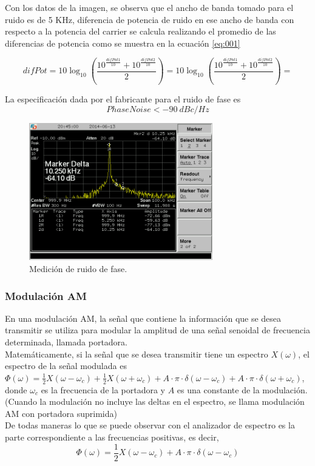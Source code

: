 \documentclass[a4paper,10pt]{article}
\begin{document}
		\indent Con los datos de la imagen, se observa que el ancho de banda 
		tomado para el ruido es de 5 KHz, diferencia de potencia de ruido en ese
		ancho de banda con respecto a la potencia del carrier se calcula 
		realizando el promedio de las diferencias de potencia como se muestra en
		la ecuaci\'on \ref{eq:001}

		\begin{equation} \label{eq:001}
			difPot = 10\log_{10}(\frac{10^{\frac{difPot1}{10}} + 10^{\frac
			{difPot2}{10}}}{2}) = 10\log_{10}(\frac{10^{\frac{difPot1}{10}} + 
			10^{\frac{difPot2}{10}}}{2}) =
		\end{equation}
		
		\indent La especificaci\'on dada por el fabricante para el ruido de fase
		es 
		$$Phase Noise<-90~dBc/Hz$$
		
		\begin{figure}[!htb]
				\centering
				\includegraphics[width=8cm]
				{Imagenes/SCREN451.png}
				\caption{Medici\'on de ruido de fase.}
				\label{ruidofase} 
		\end{figure}
		
		\subsubsection{Modulaci\'on AM}
		\indent En una modulaci\'on AM, la se\~nal que contiene la informaci\'on
		que se desea transmitir se utiliza para modular la amplitud de una 
		se\~nal senoidal de frecuencia determinada, llamada portadora. \\
		\indent Matem\'aticamente, si la se\~nal que se desea transmitir tiene 
		un espectro $X(\omega)$, el espectro de la se\~nal modulada es 
		$\Phi(\omega)=\frac{1}{2}X(\omega-\omega_c)+\frac{1}{2}X(
		\omega+\omega_c)+A\cdot\pi\cdot\delta(\omega-\omega_c)+A\cdot\pi\cdot
		\delta(\omega+\omega_c)$, donde $\omega_c$ es la frecuencia de la 
		portadora y $A$ es una constante de la modulaci\'on. (Cuando la 
		modulaci\'on no incluye las deltas en el espectro, se llama modulaci\'on
		AM con portadora suprimida) \\
		\indent De todas maneras lo que se puede observar con el analizador de 
		espectro es la parte correspondiente a las frecuencias positivas, es 
		decir,
		$$\Phi(\omega)=\frac{1}{2}X(\omega-\omega_c)+A\cdot\pi\cdot\delta(
		\omega-\omega_c)$$
		
\end{document}
